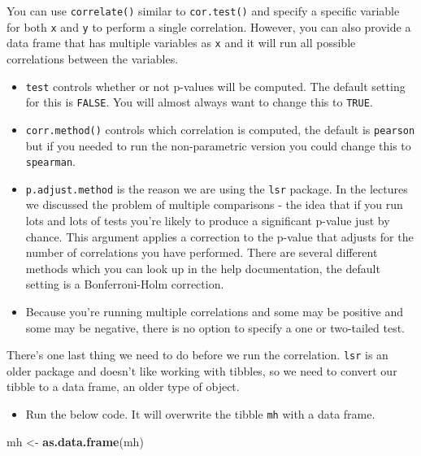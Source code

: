 \documentclass[]{book}
\newenvironment{Shaded}{\begin{snugshade}}{\end{snugshade}}
\newcommand{\KeywordTok}[1]{\textcolor[rgb]{0.13,0.29,0.53}{\textbf{#1}}}
\newcommand{\NormalTok}[1]{#1}
\newcommand{\StringTok}[1]{\textcolor[rgb]{0.31,0.60,0.02}{#1}}
\providecommand{\tightlist}{%
  \setlength{\itemsep}{0pt}\setlength{\parskip}{0pt}}
\begin{document}
You can use \texttt{correlate()} similar to \texttt{cor.test()} and specify a specific variable for both \texttt{x} and \texttt{y} to perform a single correlation. However, you can also provide a data frame that has multiple variables as \texttt{x} and it will run all possible correlations between the variables.

\begin{itemize}
\tightlist
\item
  \texttt{test} controls whether or not p-values will be computed. The default setting for this is \texttt{FALSE}. You will almost always want to change this to \texttt{TRUE}.\\
\item
  \texttt{corr.method()} controls which correlation is computed, the default is \texttt{pearson} but if you needed to run the non-parametric version you could change this to \texttt{spearman}.\\
\item
  \texttt{p.adjust.method} is the reason we are using the \texttt{lsr} package. In the lectures we discussed the problem of multiple comparisons - the idea that if you run lots and lots of tests you're likely to produce a significant p-value just by chance. This argument applies a correction to the p-value that adjusts for the number of correlations you have performed. There are several different methods which you can look up in the help documentation, the default setting is a Bonferroni-Holm correction.\\
\item
  Because you're running multiple correlations and some may be positive and some may be negative, there is no option to specify a one or two-tailed test.
\end{itemize}

There's one last thing we need to do before we run the correlation. \texttt{lsr} is an older package and doesn't like working with tibbles, so we need to convert our tibble to a data frame, an older type of object.

\begin{itemize}
\tightlist
\item
  Run the below code. It will overwrite the tibble \texttt{mh} with a data frame.
\end{itemize}

\begin{Shaded}
\begin{Highlighting}[]
\NormalTok{mh <-}\StringTok{ }\KeywordTok{as.data.frame}\NormalTok{(mh)}
\end{Highlighting}
\end{Shaded}
\end{document}
